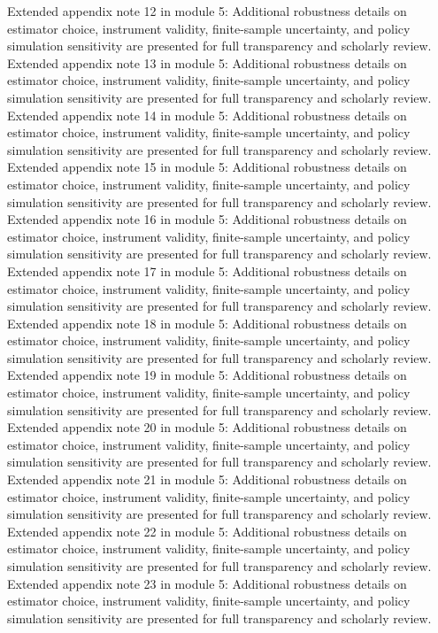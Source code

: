 \documentclass[preprint,12pt]{elsarticle}
\begin{document}
Extended appendix note 12 in module 5: Additional robustness details on estimator choice, instrument validity, finite-sample uncertainty, and policy simulation sensitivity are presented for full transparency and scholarly review.
Extended appendix note 13 in module 5: Additional robustness details on estimator choice, instrument validity, finite-sample uncertainty, and policy simulation sensitivity are presented for full transparency and scholarly review.
Extended appendix note 14 in module 5: Additional robustness details on estimator choice, instrument validity, finite-sample uncertainty, and policy simulation sensitivity are presented for full transparency and scholarly review.
Extended appendix note 15 in module 5: Additional robustness details on estimator choice, instrument validity, finite-sample uncertainty, and policy simulation sensitivity are presented for full transparency and scholarly review.
Extended appendix note 16 in module 5: Additional robustness details on estimator choice, instrument validity, finite-sample uncertainty, and policy simulation sensitivity are presented for full transparency and scholarly review.
Extended appendix note 17 in module 5: Additional robustness details on estimator choice, instrument validity, finite-sample uncertainty, and policy simulation sensitivity are presented for full transparency and scholarly review.
Extended appendix note 18 in module 5: Additional robustness details on estimator choice, instrument validity, finite-sample uncertainty, and policy simulation sensitivity are presented for full transparency and scholarly review.
Extended appendix note 19 in module 5: Additional robustness details on estimator choice, instrument validity, finite-sample uncertainty, and policy simulation sensitivity are presented for full transparency and scholarly review.
Extended appendix note 20 in module 5: Additional robustness details on estimator choice, instrument validity, finite-sample uncertainty, and policy simulation sensitivity are presented for full transparency and scholarly review.
Extended appendix note 21 in module 5: Additional robustness details on estimator choice, instrument validity, finite-sample uncertainty, and policy simulation sensitivity are presented for full transparency and scholarly review.
Extended appendix note 22 in module 5: Additional robustness details on estimator choice, instrument validity, finite-sample uncertainty, and policy simulation sensitivity are presented for full transparency and scholarly review.
Extended appendix note 23 in module 5: Additional robustness details on estimator choice, instrument validity, finite-sample uncertainty, and policy simulation sensitivity are presented for full transparency and scholarly review.
\end{document}
